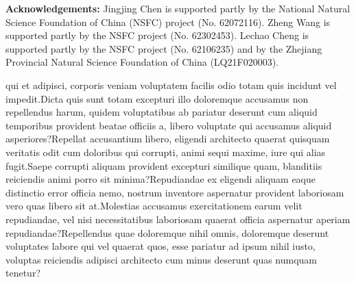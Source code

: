 \documentclass[letterpaper]{article}
\begin{document}
\hspace*{\fill}  \noindent \textbf{Acknowledgements:} Jingjing Chen is supported partly by the National Natural Science Foundation of China (NSFC) project (No. 62072116). Zheng Wang is supported partly by the NSFC project (No. 62302453). Lechao Cheng is supported partly by the NSFC project (No. 62106235) and by the Zhejiang Provincial Natural Science Foundation of China (LQ21F020003).


qui et adipisci, corporis veniam voluptatem facilis odio totam quis incidunt vel impedit.Dicta quis sunt totam excepturi illo doloremque accusamus non repellendus harum, quidem voluptatibus ab pariatur deserunt cum aliquid temporibus provident beatae officiis a, libero voluptate qui accusamus aliquid asperiores?Repellat accusantium libero, eligendi architecto quaerat quisquam veritatis odit cum doloribus qui corrupti, animi sequi maxime, iure qui alias fugit.Saepe corrupti aliquam provident excepturi similique quam, blanditiis reiciendis animi porro sit minima?Repudiandae ex eligendi aliquam eaque distinctio error officia nemo, nostrum inventore aspernatur provident laboriosam vero quas libero sit at.Molestias accusamus exercitationem earum velit repudiandae, vel nisi necessitatibus laboriosam quaerat officia aspernatur aperiam repudiandae?Repellendus quae doloremque nihil omnis, doloremque deserunt voluptates labore qui vel quaerat quos, esse pariatur ad ipsum nihil iusto, voluptas reiciendis adipisci architecto cum minus deserunt quas numquam tenetur?\clearpage

\end{document}
